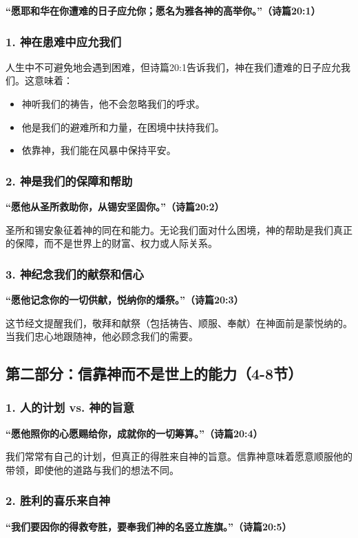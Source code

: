 \documentclass[a4paper, 12pt]{article}
\begin{document}
\textbf{“愿耶和华在你遭难的日子应允你；愿名为雅各神的高举你。”（诗篇20:1）}

\subsubsection*{1. 神在患难中应允我们}
人生中不可避免地会遇到困难，但诗篇20:1告诉我们，神在我们遭难的日子应允我们。这意味着：
\begin{itemize}
    \item 神听我们的祷告，他不会忽略我们的呼求。
    \item 他是我们的避难所和力量，在困境中扶持我们。
    \item 依靠神，我们能在风暴中保持平安。
\end{itemize}

\subsubsection*{2. 神是我们的保障和帮助}
\textbf{“愿他从圣所救助你，从锡安坚固你。”（诗篇20:2）}

圣所和锡安象征着神的同在和能力。无论我们面对什么困境，神的帮助是我们真正的保障，而不是世界上的财富、权力或人际关系。

\subsubsection*{3. 神纪念我们的献祭和信心}
\textbf{“愿他记念你的一切供献，悦纳你的燔祭。”（诗篇20:3）}

这节经文提醒我们，敬拜和献祭（包括祷告、顺服、奉献）在神面前是蒙悦纳的。当我们忠心地跟随神，他必顾念我们的需要。

\subsection*{第二部分：信靠神而不是世上的能力（4-8节）}

\subsubsection*{1. 人的计划 vs. 神的旨意}
\textbf{“愿他照你的心愿赐给你，成就你的一切筹算。”（诗篇20:4）}

我们常常有自己的计划，但真正的得胜来自神的旨意。信靠神意味着愿意顺服他的带领，即使他的道路与我们的想法不同。

\subsubsection*{2. 胜利的喜乐来自神}
\textbf{“我们要因你的得救夸胜，要奉我们神的名竖立旌旗。”（诗篇20:5）}
\end{document}
